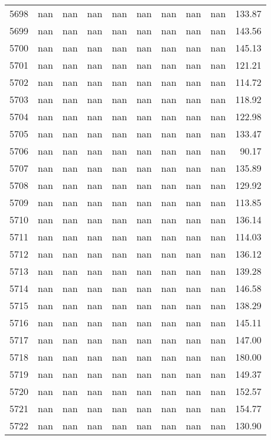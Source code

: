 \begin{tabular}{lrrrrrrrrr}
5698 & nan & nan & nan & nan & nan & nan & nan & nan & 133.87 \\
5699 & nan & nan & nan & nan & nan & nan & nan & nan & 143.56 \\
5700 & nan & nan & nan & nan & nan & nan & nan & nan & 145.13 \\
5701 & nan & nan & nan & nan & nan & nan & nan & nan & 121.21 \\
5702 & nan & nan & nan & nan & nan & nan & nan & nan & 114.72 \\
5703 & nan & nan & nan & nan & nan & nan & nan & nan & 118.92 \\
5704 & nan & nan & nan & nan & nan & nan & nan & nan & 122.98 \\
5705 & nan & nan & nan & nan & nan & nan & nan & nan & 133.47 \\
5706 & nan & nan & nan & nan & nan & nan & nan & nan & 90.17 \\
5707 & nan & nan & nan & nan & nan & nan & nan & nan & 135.89 \\
5708 & nan & nan & nan & nan & nan & nan & nan & nan & 129.92 \\
5709 & nan & nan & nan & nan & nan & nan & nan & nan & 113.85 \\
5710 & nan & nan & nan & nan & nan & nan & nan & nan & 136.14 \\
5711 & nan & nan & nan & nan & nan & nan & nan & nan & 114.03 \\
5712 & nan & nan & nan & nan & nan & nan & nan & nan & 136.12 \\
5713 & nan & nan & nan & nan & nan & nan & nan & nan & 139.28 \\
5714 & nan & nan & nan & nan & nan & nan & nan & nan & 146.58 \\
5715 & nan & nan & nan & nan & nan & nan & nan & nan & 138.29 \\
5716 & nan & nan & nan & nan & nan & nan & nan & nan & 145.11 \\
5717 & nan & nan & nan & nan & nan & nan & nan & nan & 147.00 \\
5718 & nan & nan & nan & nan & nan & nan & nan & nan & 180.00 \\
5719 & nan & nan & nan & nan & nan & nan & nan & nan & 149.37 \\
5720 & nan & nan & nan & nan & nan & nan & nan & nan & 152.57 \\
5721 & nan & nan & nan & nan & nan & nan & nan & nan & 154.77 \\
5722 & nan & nan & nan & nan & nan & nan & nan & nan & 130.90 \\

\end{tabular}
